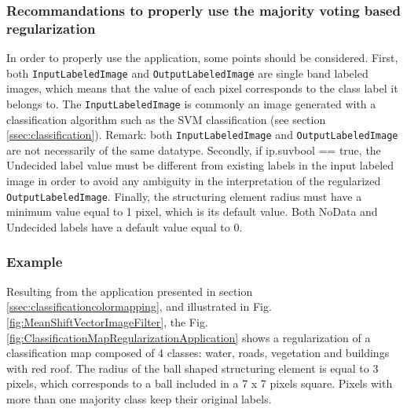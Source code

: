 \subsubsection{Recommandations to properly use the majority voting based regularization}

In order to properly use the  application, some points should be considered.
First, both \verb?InputLabeledImage? and \verb?OutputLabeledImage? are single band labeled images, which means that the
value of each pixel corresponds to the class label it belongs to. The \verb?InputLabeledImage? is commonly an image generated
with a classification algorithm such as the SVM classification (see section \ref{ssec:classification}). Remark: both
\verb?InputLabeledImage? and \verb?OutputLabeledImage? are not necessarily of the same datatype. Secondly, if ip.suvbool == true,
the Undecided label value must be different from existing labels in the input labeled image in order to avoid any ambiguity in the
interpretation of the regularized \verb?OutputLabeledImage?. Finally, the structuring element radius must have a minimum value equal to 1 pixel,
which is its default value. Both NoData and Undecided labels have a default value equal to 0.


\subsubsection{Example}

Resulting from the  application presented in section \ref{ssec:classificationcolormapping}, and illustrated in
Fig. \ref{fig:MeanShiftVectorImageFilter}, the Fig. \ref{fig:ClassificationMapRegularizationApplication} shows a regularization of a classification
map composed of 4 classes: water, roads, vegetation and buildings with red roof. The radius of the ball shaped structuring element is equal to 3 pixels,
which corresponds to a ball included in a 7 x 7 pixels square. Pixels with more than one majority class keep their original labels.

